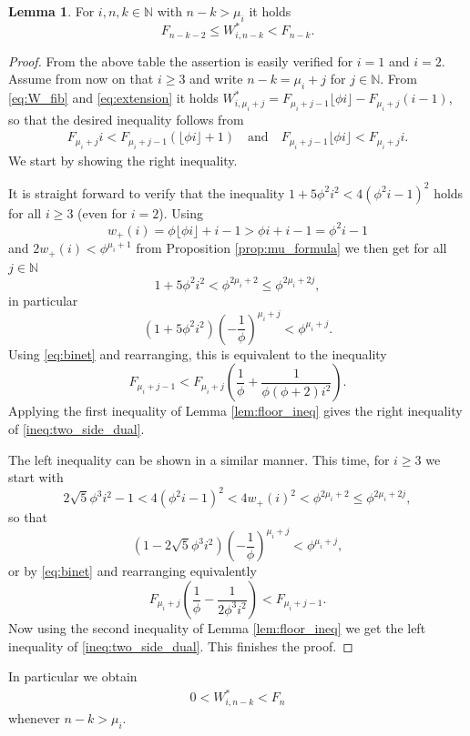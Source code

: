 \documentclass[]{interact}
\newcommand{\bbN}{\mathbb{N}}
\theoremstyle{definition}
\newtheorem{lem}[thm]{Lemma}
\numberwithin{table}{section} %
\numberwithin{figure}{section}
\begin{document}
\begin{lem} \label{lem:dual_bounds}
    For $i, n, k \in \bbN$ with $n-k > \mu_i$ it holds
    $$
    F_{n-k-2} \leq W_{i, n-k}^* < F_{n-k}.
    $$
\end{lem}
\begin{proof}
    From the above table the assertion is easily verified for $i=1$ and $i=2$. Assume from now on that $i \geq 3$ and write $n-k = \mu_i+j$ for $j \in \bbN$. From \eqref{eq:W_fib} and \eqref{eq:extension} it holds $W_{i, \mu_i+j}^* = F_{\mu_i+j-1} \lfloor \phi i\rfloor - F_{\mu_i+j} (i-1)$, so that the desired inequality follows from
    \begin{align} \label{ineq:two_side_dual}
        F_{\mu_i+j} i < F_{\mu_i+j-1} (\lfloor \phi i \rfloor + 1) \quad \text{and} \quad F_{\mu_i+j-1} \lfloor \phi i \rfloor < F_{\mu_i+j} i.
    \end{align}
    We start by showing the right inequality.
    
    It is straight forward to verify that the inequality $1 + 5\phi^{2}i^2 < 4 (\phi^2 i-1)^2$ holds for all $i \geq 3$ (even for $i=2$). Using
    $$
    w_+(i) = \phi \lfloor\phi i\rfloor +i-1 > \phi i + i -1 = \phi^2i-1
    $$
    and $2 w_+(i) < \phi^{\mu_i+1}$ from Proposition \ref{prop:mu_formula} we then get for all $j \in \bbN$
    $$
    1+5\phi^2 i^2 < \phi^{2\mu_i+2} \leq \phi^{2\mu_i+2j},
    $$
    in particular
    $$
    (1+5\phi^2 i^2) \left(-\frac1\phi\right)^{\mu_i+j} < \phi^{\mu_i+j}.
    $$
    Using \eqref{eq:binet} and rearranging, this is equivalent to the inequality
    $$
    F_{\mu_i+j-1} < F_{\mu_i+j} \left(\frac1\phi + \frac1{\phi (\phi+2) i^2}\right).
    $$
    Applying the first inequality of Lemma \ref{lem:floor_ineq} gives the right inequality of \eqref{ineq:two_side_dual}.

    The left inequality can be shown in a similar manner. This time, for $i\geq3$ we start with
    $$
    2\sqrt5 \phi^3 i^2 - 1 < 4 (\phi^2i-1)^2 < 4 w_+(i)^2 < \phi^{2\mu_i+2} \leq \phi^{2\mu_i+2j},
    $$
    so that
    $$
    \left(1 - 2\sqrt5\phi^3 i^2\right) \left(-\frac1\phi\right)^{\mu_i+j} < \phi^{\mu_i+j},
    $$
    or by \eqref{eq:binet} and rearranging equivalently
    $$
    F_{\mu_i+j} \left(\frac1\phi - \frac1{2\phi^3 i^2}\right) < F_{\mu_i+j-1}.
    $$
    Now using the second inequality of Lemma \ref{lem:floor_ineq} we get the left inequality of \eqref{ineq:two_side_dual}. This finishes the proof.
\end{proof}

In particular we obtain
\begin{align} \label{ineq:in_range}
    0 < W_{i, n-k}^* < F_n
\end{align}
whenever $n-k > \mu_i$.
\end{document}
